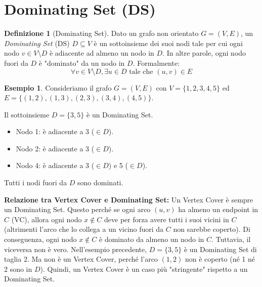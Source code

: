 \documentclass[a4paper]{article}
\theoremstyle{definition} %
\newtheorem{definition}{Definizione}[section]
\newtheorem{example}{Esempio}[section]
\theoremstyle{definition} %
\begin{document}
\section{Dominating Set (DS)}

\begin{definition}[Dominating Set]
Dato un grafo non orientato $G=(V, E)$, un \emph{Dominating Set} (DS) $D \subseteq V$ è un sottoinsieme dei suoi nodi tale per cui ogni nodo $v \in V \setminus D$ è adiacente ad almeno un nodo in $D$. In altre parole, ogni nodo fuori da $D$ è "dominato" da un nodo in $D$. Formalmente:
\[ \forall v \in V \setminus D, \exists u \in D \text{ tale che } (u, v) \in E \]
\end{definition}

\begin{example}
Consideriamo il grafo $G=(V, E)$ con $V=\{1,2,3,4,5\}$ ed $E=\{(1,2), (1,3), (2,3), (3,4), (4,5)\}$.
\begin{center}
\end{center}
Il sottoinsieme $D=\{3,5\}$ è un Dominating Set.
\begin{itemize}
    \item Nodo 1: è adiacente a 3 ($\in D$).
    \item Nodo 2: è adiacente a 3 ($\in D$).
    \item Nodo 4: è adiacente a 3 ($\in D$) e 5 ($\in D$).
\end{itemize}
Tutti i nodi fuori da $D$ sono dominati.
\end{example}

\textbf{Relazione tra Vertex Cover e Dominating Set:}
Un Vertex Cover è sempre un Dominating Set. Questo perché se ogni arco $(u,v)$ ha almeno un endpoint in $C$ (VC), allora ogni nodo $x \notin C$ deve per forza avere tutti i suoi vicini in $C$ (altrimenti l'arco che lo collega a un vicino fuori da $C$ non sarebbe coperto). Di conseguenza, ogni nodo $x \notin C$ è dominato da almeno un nodo in $C$.
Tuttavia, il viceversa non è vero. Nell'esempio precedente, $D=\{3,5\}$ è un Dominating Set di taglia 2. Ma non è un Vertex Cover, perché l'arco $(1,2)$ non è coperto (né 1 né 2 sono in $D$).
Quindi, un Vertex Cover è un caso più "stringente" rispetto a un Dominating Set.
\end{document}
